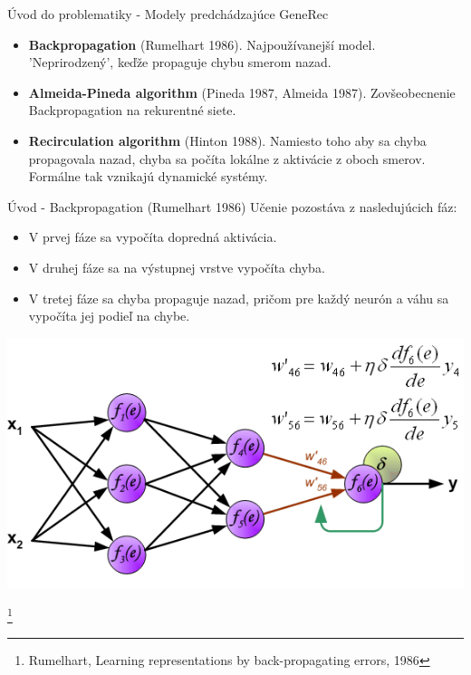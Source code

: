 \documentclass[xcolor=dvipsnames]{beamer}
\begin{document}
\begin{frame}{Úvod do problematiky - Modely predchádzajúce GeneRec}
  \begin{itemize}
    \item \textbf{Backpropagation} (Rumelhart 1986). Najpoužívanejší model. 'Neprirodzený', keďže propaguje chybu smerom nazad. 
    \item \textbf{Almeida-Pineda algorithm} (Pineda 1987, Almeida 1987). Zovšeobecnenie Backpropagation na rekurentné siete.
    \item \textbf{Recirculation algorithm} (Hinton 1988). Namiesto toho aby sa chyba propagovala nazad, chyba sa počíta lokálne z aktivácie z oboch smerov. Formálne tak vznikajú dynamické systémy. 
  \end{itemize}
\end{frame}

\begin{frame}{Úvod - Backpropagation (Rumelhart 1986)}
Učenie pozostáva z nasledujúcich fáz: 
  \begin{itemize}
    \item V prvej fáze sa vypočíta dopredná aktivácia. 
    \item V druhej fáze sa na výstupnej vrstve vypočíta chyba.
    \item V tretej fáze sa chyba propaguje nazad, pričom pre každý neurón a váhu sa vypočíta jej podieľ na chybe. 
  \end{itemize}
  \begin{center}
    \includegraphics[scale=0.4]{img/bp.png}
  \end{center}
    \footnote{Rumelhart, Learning representations by back-propagating errors, 1986}
\end{frame}
\end{document}
